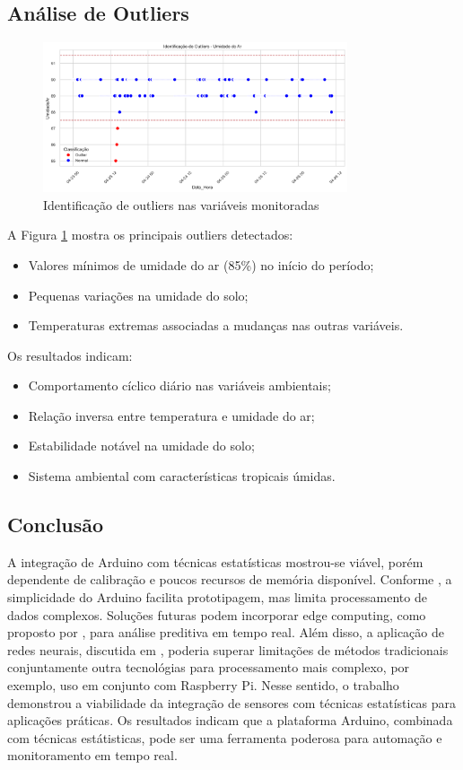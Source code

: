 \documentclass[12pt, a4paper]{article}
\begin{document}
\subsection{Análise de Outliers}
\begin{figure}[H]
\centering
\includegraphics[width=0.8\textwidth]{graficos/outliers_umidade.png}
\caption{Identificação de outliers nas variáveis monitoradas}
\label{fig:outliers}
\end{figure}

A Figura \ref{fig:outliers} mostra os principais outliers detectados:
\begin{itemize}
    \item Valores mínimos de umidade do ar (85\%) no início do período;
    \item Pequenas variações na umidade do solo;
    \item Temperaturas extremas associadas a mudanças nas outras variáveis.
\end{itemize}

Os resultados indicam:
\begin{itemize}
    \item Comportamento cíclico diário nas variáveis ambientais;
    \item Relação inversa entre temperatura e umidade do ar;
    \item Estabilidade notável na umidade do solo;
    \item Sistema ambiental com características tropicais úmidas.
\end{itemize}

\subsection{Conclusão}
\label{sec:Conclusão}
A integração de Arduino com técnicas estatísticas mostrou-se viável, porém dependente de calibração e
poucos recursos de memória disponível. Conforme \cite{Tasiran2019}, a simplicidade do Arduino facilita prototipagem, mas limita
processamento de dados complexos. Soluções futuras podem incorporar edge computing, como proposto por \cite{Selmy2024},
para análise preditiva em tempo real. Além disso, a aplicação de redes neurais, discutida em \cite{MAHDAVINEJAD2018161},
poderia superar limitações de métodos tradicionais conjuntamente outra tecnológias para processamento mais complexo, por exemplo, uso em conjunto com Raspberry Pi. Nesse sentido, o trabalho demonstrou a viabilidade da integração de sensores com técnicas estatísticas para aplicações práticas. Os resultados indicam que a plataforma Arduino, combinada
com técnicas estátisticas, pode ser uma ferramenta poderosa para automação e monitoramento em tempo real.
\end{document}
